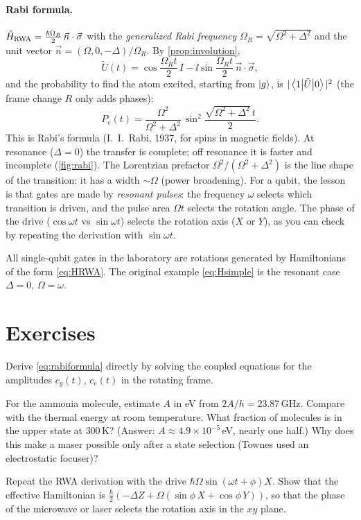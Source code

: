 \paragraph{Rabi formula.} $\tilde H_{\rm RWA}=\frac{\hbar\Omega_R}2\,\vec n\cdot\vec\sigma$ with the \emph{generalized Rabi frequency}
$\Omega_R=\sqrt{\Omega^2+\Delta^2}$ and the unit vector $\vec n=(\Omega,0,-\Delta)/\Omega_R$. By \cref{prop:involution},
\begin{equation}
  \tilde U(t)=\cos\frac{\Omega_Rt}2\,I-\ii\sin\frac{\Omega_Rt}2\,\vec n\cdot\vec\sigma,
\end{equation}
and the probability to find the atom excited, starting from $\left|g\right\rangle$, is $|\left\langle1\middle|\tilde U\middle|0\right\rangle|^2$ (the frame change $R$ only adds phases):
\begin{equation}\label{eq:rabiformula}
  P_e(t)=\frac{\Omega^2}{\Omega^2+\Delta^2}\,\sin^2\frac{\sqrt{\Omega^2+\Delta^2}\,t}2.
\end{equation}
This is Rabi's formula (I.~I.~Rabi, 1937, for spins in magnetic fields). At resonance ($\Delta=0$) the transfer is complete; off
resonance it is faster and incomplete (\cref{fig:rabi}). The Lorentzian prefactor $\Omega^2/(\Omega^2+\Delta^2)$ is the line shape of
the transition: it has a width $\sim\Omega$ (power broadening). For a qubit, the lesson is that gates are made by \emph{resonant pulses}:
the frequency $\omega$ selects which transition is driven, and the pulse area $\Omega t$ selects the rotation angle. The phase of the
drive ($\cos\omega t$ vs $\sin\omega t$) selects the rotation axis ($X$ or $Y$), as you can check by repeating the derivation with
$\sin\omega t$.

\begin{keypoint}
All single-qubit gates in the laboratory are rotations generated by Hamiltonians of the form \cref{eq:HRWA}. The original example
\cref{eq:Hsimple} is the resonant case $\Delta=0$, $\Omega=\omega$.
\end{keypoint}

\section{Exercises}
\begin{exercise}
Derive \cref{eq:rabiformula} directly by solving the coupled equations for the amplitudes $c_g(t)$, $c_e(t)$ in the rotating frame.
\end{exercise}
\begin{exercise}
For the ammonia molecule, estimate $A$ in eV from $2A/h=23.87$\,GHz. Compare with the thermal energy at room temperature. What fraction
of molecules is in the upper state at $300$\,K? (Answer: $A\approx4.9\times10^{-5}$\,eV, nearly one half.) Why does this make a maser
possible only after a state selection (Townes used an electrostatic focuser)?
\end{exercise}
\begin{exercise}
Repeat the RWA derivation with the drive $\hbar\Omega\sin(\omega t+\phi)X$. Show that the effective Hamiltonian is
$\frac\hbar2(-\Delta Z+\Omega(\sin\phi\,X+\cos\phi\,Y))$, so that the phase of the microwave or laser selects the rotation axis in the $xy$ plane.
\end{exercise}
